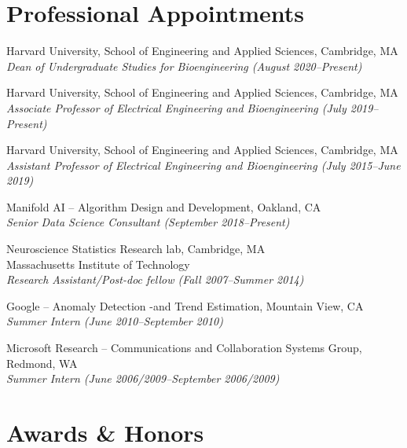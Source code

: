 \documentclass[12pt,letterpaper]{article}
\renewenvironment{itemize}{
  \begin{list}{}{
    \setlength{\leftmargin}{1.5em}
    \setlength{\itemsep}{0.25em}
    \setlength{\parskip}{0pt}
    \setlength{\parsep}{0.25em}
  }
}{
  \end{list}
}
\begin{document}
\section*{Professional Appointments}

\begin{itemize}
    \item Harvard University, School of Engineering and Applied Sciences, Cambridge, MA\\
          \emph{Dean of Undergraduate Studies for Bioengineering (August 2020--Present)}
    \item Harvard University, School of Engineering and Applied Sciences, Cambridge, MA\\
          \emph{Associate Professor of Electrical Engineering and Bioengineering (July 2019--Present)}
    \item Harvard University, School of Engineering and Applied Sciences, Cambridge, MA\\
          \emph{Assistant Professor of Electrical Engineering and Bioengineering (July 2015--June 2019)}
          
    \item Manifold AI -- Algorithm Design and Development, Oakland, CA\\
          \emph{Senior Data Science Consultant (September 2018--Present)}
          
    \item Neuroscience Statistics Research lab, Cambridge, MA\\
          Massachusetts Institute of Technology \\
          \emph{Research Assistant/Post-doc fellow (Fall 2007--Summer 2014)}

    \item Google -- Anomaly Detection -and Trend Estimation, Mountain View, CA\\
          \emph{Summer Intern (June 2010--September 2010)}

    \item Microsoft Research -- Communications and Collaboration Systems Group, Redmond, WA\\
          \emph{Summer Intern (June 2006/2009--September 2006/2009)}
\end{itemize}

\section*{Awards \& Honors}
\end{document}
